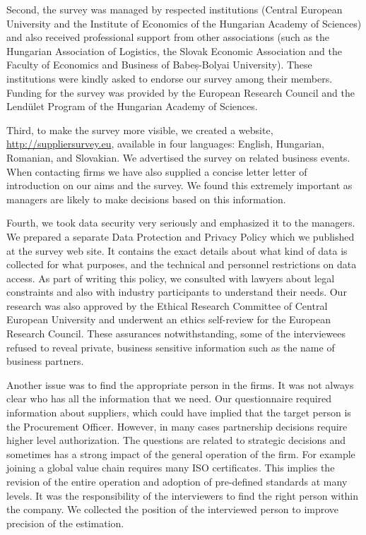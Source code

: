 \documentclass[final, dvipsnames, authoryear,12pt]{elsarticle}
\begin{document}
Second, the survey was managed by respected institutions (Central European University and the Institute of Economics of the Hungarian Academy of Sciences) and also received professional support from other associations (such as the Hungarian Association of Logistics, the Slovak Economic Association and the Faculty of Economics and Business of Babeș-Bolyai University). These institutions were kindly asked to endorse our survey among their members. Funding for the survey was provided by the European Research Council and the Lendület Program of the Hungarian Academy of Sciences. 

Third, to make the survey more visible, we created a website, \url{http://suppliersurvey.eu}, available in four languages: English, Hungarian, Romanian, and Slovakian. We advertised the survey on related business events.
When contacting firms we have also supplied a concise letter letter of introduction on our aims and the survey. We found this extremely important as managers are likely to make decisions based on this information.

Fourth, we took data security very seriously and emphasized it to the managers. We prepared a separate Data Protection and Privacy Policy which we published at the survey web site. It contains the exact details about what kind of data is collected for what purposes, and the technical and personnel restrictions on data access. As part of writing this policy, we consulted with lawyers about legal constraints and also with industry participants to understand their needs. Our research was also approved by the Ethical Research Committee of Central European University and underwent an ethics self-review for the European Research Council. These assurances notwithstanding, some of the interviewees refused to reveal private, business sensitive information such as the name of business partners.    

Another issue was to find the appropriate person in the firms. It was not always clear who has all the information that we need. Our questionnaire required information about suppliers, which could have implied that the target person is the Procurement Officer. However, in many cases partnership decisions require higher level authorization. The questions are related to strategic decisions and sometimes has a strong impact of the general operation of the firm. For example joining a global value chain requires many ISO certificates. This implies the revision of the entire operation and adoption of pre-defined standards at many levels. It was the responsibility of the interviewers to find the right person within the company. We collected the position of the interviewed person to improve precision of the estimation.
\end{document}

